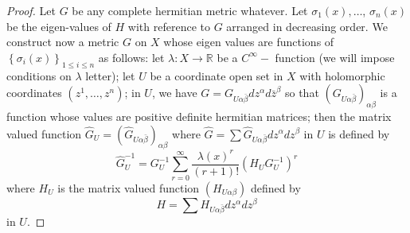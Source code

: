 \documentclass[lang=en,12pt]{beautybook}
\begin{document}
\begin{proof}
  Let $G$ be any complete hermitian metric whatever. Let $\sigma_1(x), \ldots$, $\sigma_n(x)$ be the eigen-values of $H$ with reference to $G$ arranged in decreasing order. We construct now a metric $G$ on $X$ whose eigen values are functions of $\left\{\sigma_i(x)\right\}_{1 \leq i \leq n}$ as follows: let $\lambda: X \rightarrow \mathbb{R}$ be a $C^{\infty}-$ function (we will impose conditions on $\lambda$ letter); let $U$ be a coordinate open set in $X$ with holomorphic coordinates $\left(z^1, \ldots, z^n\right)$; in $U$, we have $G=G_{U \alpha \bar{\beta}} d z^\alpha d \bar{z}^\beta$ so that $\left(G_{U \alpha \bar{\beta}}\right)_{\alpha \beta}$ is a function whose values are positive definite hermitian matrices; then the matrix valued function $\widehat{G}_U=\left(\widehat{G}_{U \alpha \bar{\beta}}\right)_{\alpha \beta}$ where $\widehat{G}=\sum \widehat{G}_{U \alpha \bar{\beta}} d z^\alpha d z^\beta$ in $U$ is defined by
  \begin{equation*}
    \widehat{G}_U^{-1}=G_U^{-1} \sum_{r=0}^{\infty} \frac{\lambda(x)^r}{(r+1) !}\left(H_U G_U^{-1}\right)^r
  \end{equation*}
  where $H_U$ is the matrix valued function $\left(H_{U \alpha \beta}\right)$ defined by
  \begin{equation*}
    H=\sum H_{U \alpha \bar{\beta}} d z^\alpha d z^\beta
  \end{equation*}
  in $U$.


\end{proof}
\end{document}
